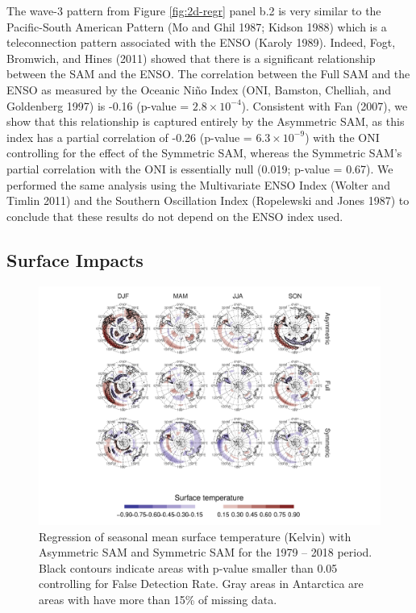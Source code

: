 \documentclass[smallextended]{svjour3}       %
\begin{document}
The wave-3 pattern from Figure \ref{fig:2d-regr} panel b.2 is very similar to the Pacific-South American Pattern (Mo and Ghil 1987; Kidson 1988) which is a teleconnection pattern associated with the ENSO (Karoly 1989). Indeed, Fogt, Bromwich, and Hines (2011) showed that there is a significant relationship between the SAM and the ENSO. The correlation between the Full SAM and the ENSO as measured by the Oceanic Niño Index (ONI, Bamston, Chelliah, and Goldenberg 1997) is -0.16 (p-value = \ensuremath{2.8\times 10^{-4}}). Consistent with Fan (2007), we show that this relationship is captured entirely by the Asymmetric SAM, as this index has a partial correlation of -0.26 (p-value = \ensuremath{6.3\times 10^{-9}}) with the ONI controlling for the effect of the Symmetric SAM, whereas the Symmetric SAM's partial correlation with the ONI is essentially null (0.019; p-value = 0.67). We performed the same analysis using the Multivariate ENSO Index (Wolter and Timlin 2011) and the Southern Oscillation Index (Ropelewski and Jones 1987) to conclude that these results do not depend on the ENSO index used.

\hypertarget{impacts}{%
\subsection{Surface Impacts}\label{impacts}}

\begin{figure}
\includegraphics{figures/regr-air-season-1} \caption{Regression of seasonal mean surface temperature (Kelvin) with Asymmetric SAM and Symmetric SAM for the 1979 -- 2018 period. Black contours indicate areas with p-value smaller than 0.05 controlling for False Detection Rate. Gray areas in Antarctica are areas with have more than 15\% of missing data.}\label{fig:regr-air-season}
\end{figure}
\end{document}
